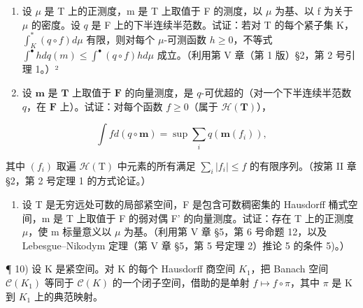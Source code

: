 \begin{enumerate}
\item
  设 \(\mu\) 是 T 上的正测度，m 是 T 上取值于 F 的测度，以 \(\mu\) 为基、以 f 为关于 \(\mu\) 的密度。设 \(q\) 是 F 上的下半连续半范数。试证：若对 T 的每个紧子集 K，\(\int_{K}^{*}(q \circ f) d\mu\) 有限，则对每个 \(\mu\)-可测函数 \(h \geqslant 0\)，不等式 \(\int^{\bullet} h dq(m) \leqslant \int^{\bullet} (q \circ f) h d\mu\) 成立。（利用第 V 章（第 1 版）§2，第 2 号引理 1。）²
\item
  设 \(\mathbf{m}\) 是 \(\mathbf{T}\) 上取值于 \(\mathbf{F}\) 的向量测度，是 \(q\)-可优超的（对一个下半连续半范数 \(q\)，在 \(\mathbf{F}\) 上）。试证：对每个函数 \(f \geqslant 0\)（属于 \(\mathcal{H}(\mathbf{T})\)），
\end{enumerate}

\[
\int f d (q \circ \mathbf {m}) = \sup \sum_ {i} q (\mathbf {m} (f _ {i})),
\]

其中 \((f_i)\) 取遍 \(\mathcal{H}(\mathrm{T})\) 中元素的所有满足 \(\sum_{i}|f_i| \leqslant f\) 的有限序列。（按第 II 章 §2，第 2 号定理 1 的方式论证。）

\begin{enumerate}
\def\labelenumi{\arabic{enumi})}
\setcounter{enumi}{8}
\tightlist
\item
  设 T 是无穷远处可数的局部紧空间，F 是包含可数稠密集的 Hausdorff 桶式空间，m 是 T 上取值于 F 的弱对偶 F' 的向量测度。试证：存在 T 上的正测度 \(\mu\)，使 m 标量意义以 \(\mu\) 为基。（利用第 V 章 §5，第 6 号命题 12，以及 Lebesgue--Nikodym 定理（第 V 章 §5，第 5 号定理 2）推论 5 的条件 5)。）
\end{enumerate}

¶ 10) 设 K 是紧空间。对 K 的每个 Hausdorff 商空间 \(K_{1}\)，把 Banach 空间 \(\mathcal{C}(K_{1})\) 等同于 \(\mathcal{C}(K)\) 的一个闭子空间，借助的是单射 \(f \mapsto f \circ \pi\)，其中 \(\pi\) 是 K 到 \(K_{1}\) 上的典范映射。

